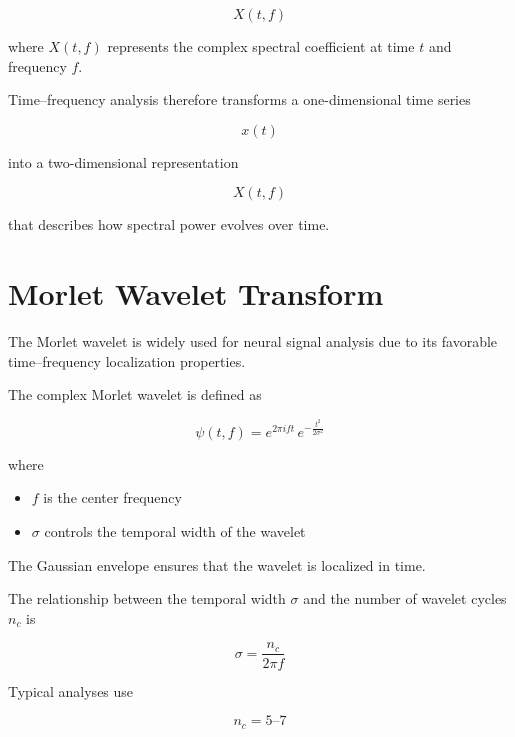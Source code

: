 \documentclass[11pt]{report}
\begin{document}
\begin{equation}
X(t,f)
\end{equation}

where $X(t,f)$ represents the complex spectral coefficient
at time $t$ and frequency $f$.

Time--frequency analysis therefore transforms a one-dimensional
time series

\begin{equation}
x(t)
\end{equation}

into a two-dimensional representation

\begin{equation}
X(t,f)
\end{equation}

that describes how spectral power evolves over time.

\section{Morlet Wavelet Transform}

The Morlet wavelet is widely used for neural signal analysis due
to its favorable time--frequency localization properties.

The complex Morlet wavelet is defined as

\begin{equation}
\psi(t,f) =
e^{2\pi i f t}
\,
e^{-\frac{t^2}{2\sigma^2}}
\end{equation}

where

\begin{itemize}
\item $f$ is the center frequency
\item $\sigma$ controls the temporal width of the wavelet
\end{itemize}

The Gaussian envelope ensures that the wavelet is localized in time.

The relationship between the temporal width $\sigma$ and the number
of wavelet cycles $n_c$ is

\begin{equation}
\sigma = \frac{n_c}{2\pi f}
\end{equation}

Typical analyses use

\begin{equation}
n_c = 5\text{--}7
\end{equation}
\end{document}

